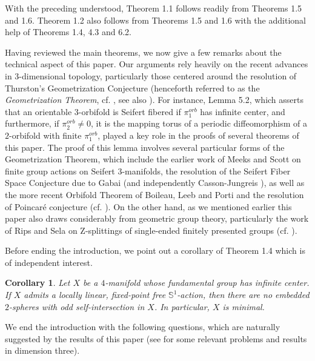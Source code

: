 \documentclass[11pt]{amsart}
\theoremstyle{plain}
\numberwithin{theorem}{section}
\newtheorem{corollary}[theorem]{Corollary}
\theoremstyle{definition}
\begin{document}
With the preceding understood, Theorem 1.1 follows readily from Theorems 1.5 and 1.6. Theorem 1.2 also follows from Theorems 1.5 and 1.6 with the additional help of Theorems 1.4, 4.3 and 6.2. 

\vspace{2mm}

Having reviewed the main theorems, we now give a few remarks about the technical aspect
of this paper. Our arguments rely heavily on the recent advances in $3$-dimensional topology, 
particularly those centered around the resolution of Thurston's Geometrization Conjecture 
(henceforth referred to as the {\it Geometrization Theorem}, cf. \cite{BLP, P}, see also \cite{DL}). 
For instance, Lemma 5.2, which asserts that an orientable $3$-orbifold is Seifert fibered 
if $\pi_1^{orb}$ has infinite center, and furthermore, if $\pi_2^{orb}\neq 0$, it is the mapping torus of
a periodic diffeomorphism of a $2$-orbifold with finite $\pi_1^{orb}$, played a key role in the proofs 
of several theorems of this paper. The proof of this lemma involves several particular forms 
of the Geometrization Theorem, which include the earlier work of Meeks and Scott \cite{MS} 
on finite group actions on Seifert $3$-manifolds, the resolution of the Seifert Fiber Space 
Conjecture due to Gabai \cite{Gabai} (and independently Casson-Jungreis \cite{CJ}), as 
well as the more recent Orbifold Theorem of Boileau, Leeb and Porti \cite{BLP} and the 
resolution of Poincar\'{e} conjecture (cf. \cite{P}). On the other hand, as we mentioned earlier 
this paper also draws considerably from geometric group theory, particularly the work of Rips 
and Sela on Z-splittings of single-ended finitely presented groups (cf. \cite{RipS}). 

\vspace{2mm}

Before ending the introduction, we point out a corollary of Theorem 1.4 which is of independent interest.

\begin{corollary}
Let $X$ be a $4$-manifold whose fundamental group has infinite center. If $X$ admits a locally linear,
fixed-point free ${{\mathbb S}}^1$-action, then there are no embedded $2$-spheres with odd
self-intersection in $X$. In particular, $X$ is minimal. 
\end{corollary}

We end the introduction with the following questions, which are naturally suggested by the results 
of this paper (see \cite{Sw,Thom,Turaev, MT, Turaev1} for some relevant problems and results in 
dimension three). 
\end{document}

